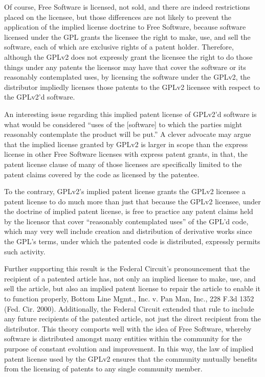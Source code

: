 Of course, Free Software is licensed, not sold, and there are indeed
restrictions placed on the licensee, but those differences are not likely
to prevent the application of the implied license doctrine to Free
Software, because software licensed under the GPL grants the licensee the
right to make, use, and sell the software, each of which are exclusive
rights of a patent holder. Therefore, although the GPLv2 does not expressly
grant the licensee the right to do those things under any patents the
licensor may have that cover the software or its reasonably contemplated
uses, by licensing the software under the GPLv2, the distributor impliedly
licenses those patents to the GPLv2 licensee with respect to the GPLv2'd
software.

An interesting issue regarding this implied patent license of GPLv2'd
software is what would be considered ``uses of the [software] to which
the parties might reasonably contemplate the product will be put.'' A
clever advocate may argue that the implied license granted by GPLv2 is
larger in scope than the express license in other Free Software
licenses with express patent grants, in that, the patent license
clause of many of those licenses are specifically limited to the
patent claims covered by the code as licensed by the patentee.

To the contrary, GPLv2's implied patent license grants the GPLv2 licensee a
patent license to do much more than just that because the GPLv2 licensee,
under the doctrine of implied patent license, is free to practice any
patent claims held by the licensor that cover ``reasonably contemplated
uses'' of the GPL'd code, which may very well include creation and
distribution of derivative works since the GPL's terms, under which the
patented code is distributed, expressly permits such activity.

Further supporting this result is the Federal Circuit's pronouncement that
the recipient of a patented article has, not only an implied license to
make, use, and sell the article, but also an implied patent license to
repair the article to enable it to function properly, Bottom Line Mgmt.,
Inc. v. Pan Man, Inc., 228 F.3d 1352 (Fed. Cir. 2000). Additionally, the
Federal Circuit extended that rule to include any future recipients of the
patented article, not just the direct recipient from the distributor.
This theory comports well with the idea of Free Software, whereby software
is distributed amongst many entities within the community for the purpose
of constant evolution and improvement. In this way, the law of implied
patent license used by the GPLv2 ensures that the community mutually
benefits from the licensing of patents to any single community member.

